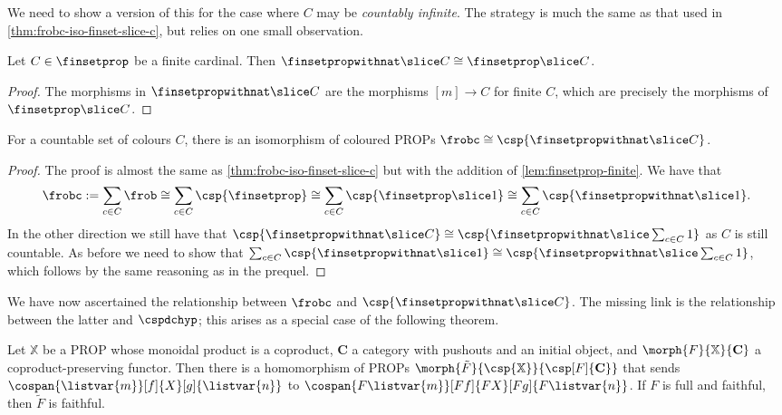 We need to show a version of this for the case where \(C\) may be
\emph{countably infinite}.
The strategy is much the same as that used in
\cref{thm:frobc-iso-finset-slice-c}, but relies on one small observation.

\begin{lemma}
    \label{lem:finsetprop-finite}
    Let \(C \in \finsetprop\) be a finite cardinal.
    Then \(\finsetpropwithnat \slice C \cong \finsetprop \slice C\).
\end{lemma}
\begin{proof}
    The morphisms in \(\finsetpropwithnat \slice C\) are the morphisms
    \([m] \to C\) for finite \(C\), which are precisely the morphisms of
    \(\finsetprop \slice C\).
\end{proof}

\begin{theorem}
    \label{thm:frobc-iso-hatfinset-slice-c}
    For a countable set of colours \(C\), there is an isomorphism of coloured
    PROPs \(\frobc \cong \csp{\finsetpropwithnat \slice C}\).
\end{theorem}
\begin{proof}
    The proof is almost the same as \cref{thm:frobc-iso-finset-slice-c} but with
    the addition of \cref{lem:finsetprop-finite}.
    We have that \[
        \frobc
        :=
        \sum_{c \in C}\frob
        \cong
        \sum_{c \in C}\csp{\finsetprop}
        \cong
        \sum_{c \in C}\csp{\finsetprop \slice 1}
        \cong
        \sum_{c \in C}\csp{\finsetpropwithnat \slice 1}.
    \]
    In the other direction we still have that \(
        \csp{\finsetpropwithnat \slice C}
        \cong
        \csp{\finsetpropwithnat \slice \sum_{c \in C} 1}
    \) as \(C\) is still countable.
    As before we need to show that \(
        \sum_{c \in C}\csp{\finsetpropwithnat \slice 1}
        \cong
        \csp{\finsetpropwithnat \slice \sum_{c \in C} 1}
    \), which follows by the same reasoning as in the prequel.
\end{proof}

We have now ascertained the relationship between \(\frobc\) and
\(\csp{\finsetpropwithnat \slice C}\).
The missing link is the relationship between the latter and \(\cspdchyp\);
this arises as a special case of the following theorem.

\begin{theorem}
    \label{thm:cospan-homomorphism}
    Let \(\mathbb{X}\) be a PROP whose monoidal product is a coproduct,
    \(\mathbf{C}\) a category with pushouts and an initial object, and
    \(\morph{F}{\mathbb{X}}{\mathbf{C}}\) a coproduct-preserving functor.
    Then there is a homomorphism of PROPs \(
        \morph{\tilde{F}}{\csp{\mathbb{X}}}{\csp[F]{\mathbf{C}}}
    \) that sends \(\cospan{\listvar{m}}[f]{X}[g]{\listvar{{n}}}\) to
    \(\cospan{F\listvar{m}}[Ff]{FX}[Fg]{F\listvar{n}}\).
    If \(F\) is full and faithful, then \(\tilde{F}\) is faithful.
\end{theorem}

